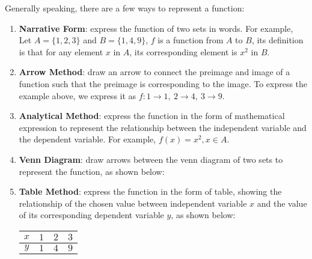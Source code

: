 \documentclass{report}
\begin{document}
Generally speaking, there are a few ways to represent a function:
\begin{enumerate}
  \item \textbf{Narrative Form}: express the function of two sets in words. For example, Let $A = \big\{1, 2, 3\big\}$ and $B = \big\{1, 4, 9\big\}$, $f$ is a function from $A$ to $B$, its definition is that for any element $x$ in $A$, its corresponding element is $x^2$ in $B$.
  \item \textbf{Arrow Method}: draw an arrow to connect the preimage and image of a function such that the preimage is corresponding to the image. To express the example above, we express it as $f: 1 \to 1,\ 2 \to 4,\ 3 \to 9$.
  \item \textbf{Analytical Method}: express the function in the form of mathematical expression to represent the relationship between the independent variable and the dependent variable. For example, $f(x) = x^2, x \in A$.
  \item \textbf{Venn Diagram}: draw arrows between the venn diagram of two sets to represent the function, as shown below:
        \begin{center}
        \end{center}
  \item \textbf{Table Method}: express the function in the form of table, showing the relationship of the chosen value between independent variable $x$ and the value of its corresponding dependent variable $y$, as shown below:
        \begin{center}
          \begin{tabular}{|c|c|c|c|}
            \hline
            $x$ & $1$ & $2$ & $3$ \\
            \hline
            $y$ & $1$ & $4$ & $9$ \\
            \hline
          \end{tabular}
        \end{center}


\end{enumerate}
\end{document}
